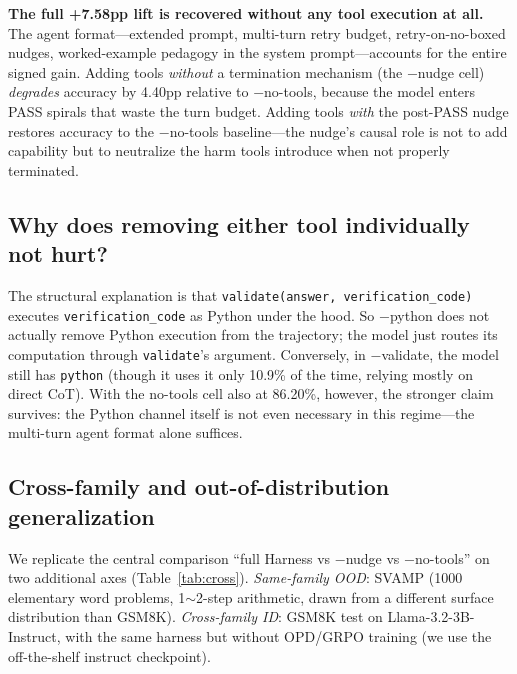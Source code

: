 \documentclass[10pt]{article}
\begin{document}
\textbf{The full +7.58pp lift is recovered without any tool execution at all.} The agent format---extended prompt, multi-turn retry budget, retry-on-no-boxed nudges, worked-example pedagogy in the system prompt---accounts for the entire signed gain. Adding tools \emph{without} a termination mechanism (the $-$nudge cell) \emph{degrades} accuracy by 4.40pp relative to $-$no-tools, because the model enters PASS spirals that waste the turn budget. Adding tools \emph{with} the post-PASS nudge restores accuracy to the $-$no-tools baseline---the nudge's causal role is not to add capability but to neutralize the harm tools introduce when not properly terminated.

\subsection{Why does removing either tool individually not hurt?}

The structural explanation is that \texttt{validate(answer, verification\_code)} executes \texttt{verification\_code} as Python under the hood. So $-$python does not actually remove Python execution from the trajectory; the model just routes its computation through \texttt{validate}'s argument. Conversely, in $-$validate, the model still has \texttt{python} (though it uses it only 10.9\% of the time, relying mostly on direct CoT). With the no-tools cell also at 86.20\%, however, the stronger claim survives: the Python channel itself is not even necessary in this regime---the multi-turn agent format alone suffices.

\subsection{Cross-family and out-of-distribution generalization}
\label{sec:crossfamily}

We replicate the central comparison ``full Harness vs $-$nudge vs $-$no-tools'' on two additional axes (Table~\ref{tab:cross}). \emph{Same-family OOD}: SVAMP (1000 elementary word problems, 1$\sim$2-step arithmetic, drawn from a different surface distribution than GSM8K). \emph{Cross-family ID}: GSM8K test on Llama-3.2-3B-Instruct, with the same harness but without OPD/GRPO training (we use the off-the-shelf instruct checkpoint).
\end{document}
